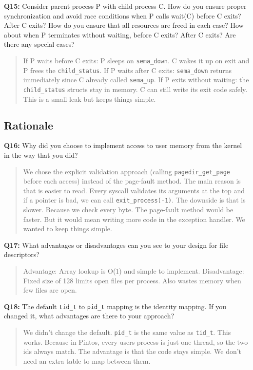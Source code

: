 \documentclass[a4paper,11pt]{paper}
\begin{document}
\textbf{Q15:} Consider parent process P with child process C. How do you ensure proper synchronization and avoid race conditions when P calls wait(C) before C exits?  After C exits?  How do you ensure that all resources are freed in each case? How about when P terminates without waiting, before C exits?  After C exits?  Are there any special cases?
\begin{quote}
If P waits before C exits: P sleeps on \texttt{sema\_down}. C wakes it
up on exit and P frees the \texttt{child\_status}.
If P waits after C exits: \texttt{sema\_down} returns immediately since
C already called \texttt{sema\_up}.
If P exits without waiting: the \texttt{child\_status} structs stay in
memory. C can still write its exit code safely. This is a small leak but
keeps things simple.
\end{quote}

\subsection{Rationale}

\textbf{Q16:} Why did you choose to implement access to user memory from the kernel in the way that you did?
\begin{quote}
We chose the explicit validation approach (calling \texttt{pagedir\_get\_page} before each access) instead of the page-fault method. The main reason is that is easier to read. Every syscall validates its arguments at the top and if a pointer is bad, we can call \texttt{exit\_process(-1)}.
The downside is that is slower. Because we check every byte. The page-fault method would be faster. But it would mean writing more code in the exception handler. We wanted to keep things simple.
\end{quote}

\textbf{Q17:} What advantages or disadvantages can you see to your design for file descriptors?
\begin{quote}
Advantage: Array lookup is O(1) and simple to implement.
Disadvantage: Fixed size of 128 limits open files per process. Also wastes
memory when few files are open.
\end{quote}

\textbf{Q18:} The default \texttt{tid\_t} to \texttt{pid\_t} mapping is the identity mapping. If you changed it, what advantages are there to your approach?
\begin{quote}
We didn't change the default. \texttt{pid\_t} is the same value as \texttt{tid\_t}. This works. Because in Pintos, every users process is just one thread, so the two ids always match.
The advantage is that the code stays simple. We don't need an extra table to map between them.
\end{quote}
\end{document}
